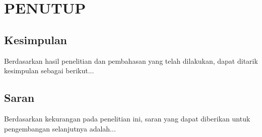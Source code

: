 \chapter{PENUTUP}


\section{Kesimpulan}
Berdasarkan hasil penelitian dan pembahasan yang telah dilakukan, dapat ditarik kesimpulan sebagai berikut...

\section{Saran}
Berdasarkan kekurangan pada penelitian ini, saran yang dapat diberikan untuk pengembangan selanjutnya adalah...